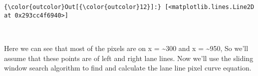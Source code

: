 \documentclass[11pt]{article}
\begin{document}
\begin{Verbatim}[commandchars=\\\{\}]
{\color{outcolor}Out[{\color{outcolor}12}]:} [<matplotlib.lines.Line2D at 0x293cc4f6940>]
\end{Verbatim}
            
    \begin{center}
    \end{center}
    { \hspace*{\fill} \\}
    
    Here we can see that most of the pixels are on x = \textasciitilde{}300
and x = \textasciitilde{}950, So we'll assume that these points are of
left and right lane lines. Now we'll use the sliding window search
algorithm to find and calculate the lane line pixel curve equation.
\end{document}
